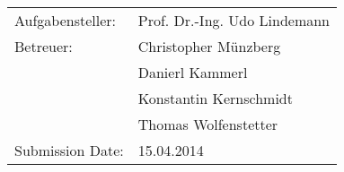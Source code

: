 \begin{titlepage}
\begin{center}
\begin{large}
\begin{tabular}{ll}
Aufgabensteller:&Prof. Dr.-Ing. Udo Lindemann\\
\vspace{0.1in}
Betreuer: &Christopher M\"unzberg\\	
\vspace{0.1in}
&Danierl Kammerl\\
\vspace{0.1in}
&Konstantin Kernschmidt\\
\vspace{0.2in}
&Thomas Wolfenstetter\\
Submission Date:&15.04.2014\end{tabular}
\end{large}
\end{center}


\end{titlepage}
